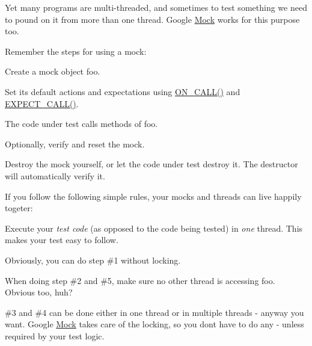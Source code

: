 Yet many programs are multi-\/threaded, and sometimes to test something we need to pound on it from more than one thread. Google \hyperlink{classMock}{Mock} works for this purpose too.

Remember the steps for using a mock\+:


\begin{DoxyEnumerate}
\item Create a mock object {\ttfamily foo}.
\end{DoxyEnumerate}
\begin{DoxyEnumerate}
\item Set its default actions and expectations using {\ttfamily \hyperlink{gmock-spec-builders_8h_a5b12ae6cf84f0a544ca811b380c37334}{O\+N\+\_\+\+C\+A\+L\+L()}} and {\ttfamily \hyperlink{gmock-spec-builders_8h_a535a6156de72c1a2e25a127e38ee5232}{E\+X\+P\+E\+C\+T\+\_\+\+C\+A\+L\+L()}}.
\end{DoxyEnumerate}
\begin{DoxyEnumerate}
\item The code under test calls methods of {\ttfamily foo}.
\end{DoxyEnumerate}
\begin{DoxyEnumerate}
\item Optionally, verify and reset the mock.
\end{DoxyEnumerate}
\begin{DoxyEnumerate}
\item Destroy the mock yourself, or let the code under test destroy it. The destructor will automatically verify it.
\end{DoxyEnumerate}

If you follow the following simple rules, your mocks and threads can live happily togeter\+:


\begin{DoxyItemize}
\item Execute your {\itshape test code} (as opposed to the code being tested) in {\itshape one} thread. This makes your test easy to follow.
\item Obviously, you can do step \#1 without locking.
\item When doing step \#2 and \#5, make sure no other thread is accessing {\ttfamily foo}. Obvious too, huh?
\item \#3 and \#4 can be done either in one thread or in multiple threads -\/ anyway you want. Google \hyperlink{classMock}{Mock} takes care of the locking, so you don\textquotesingle{}t have to do any -\/ unless required by your test logic.
\end{DoxyItemize}


